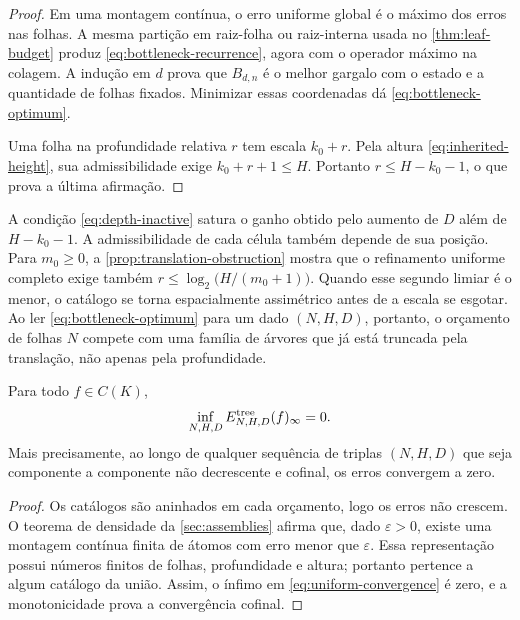 \begin{proof}
Em uma montagem contínua, o erro uniforme global é o máximo dos erros nas
folhas. A mesma partição em raiz-folha ou raiz-interna usada no
\cref{thm:leaf-budget} produz
\eqref{eq:bottleneck-recurrence}, agora com o operador máximo na colagem.
A indução em $d$ prova que $B_{d,n}$ é o melhor gargalo com o estado e a
quantidade de folhas fixados. Minimizar essas coordenadas dá
\eqref{eq:bottleneck-optimum}.

Uma folha na profundidade relativa $r$ tem escala $k_0+r$. Pela altura
\eqref{eq:inherited-height}, sua admissibilidade exige
$k_0+r+1\le H$. Portanto $r\le H-k_0-1$, o que prova a última afirmação.
\end{proof}

\begin{remark}
\label{rem:depth-vs-translation}
A condição \eqref{eq:depth-inactive} satura o ganho obtido pelo aumento de $D$
além de $H-k_0-1$. A admissibilidade de cada célula também depende de sua
posição.
Para $m_0\ge0$, a \cref{prop:translation-obstruction} mostra que o refinamento
uniforme completo exige também
$r\le\log_2\bigl(H/(m_0+1)\bigr)$. Quando esse segundo limiar é o menor, o
catálogo se torna espacialmente assimétrico antes de a escala se esgotar. Ao ler
\eqref{eq:bottleneck-optimum} para um dado $(N,H,D)$, portanto, o orçamento de
folhas $N$ compete com uma família de árvores que já está truncada pela
translação, não apenas pela profundidade.
\end{remark}

\begin{corollary}
\label{cor:uniform-convergence}
Para todo $f\in C(K)$,
\begin{equation}
 \inf_{N,H,D}E_{N,H,D}^{\rm tree}(f)_\infty=0.
 \label{eq:uniform-convergence}
\end{equation}
Mais precisamente, ao longo de qualquer sequência de triplas $(N,H,D)$ que
seja componente a componente não decrescente e cofinal, os erros convergem a
zero.
\end{corollary}

\begin{proof}
Os catálogos são aninhados em cada orçamento, logo os erros não crescem. O
teorema de densidade da \cref{sec:assemblies} afirma que, dado $\varepsilon>0$,
existe uma montagem contínua finita de átomos com erro menor que
$\varepsilon$. Essa representação possui números finitos de folhas,
profundidade e altura; portanto pertence a algum catálogo da união. Assim, o
ínfimo em \eqref{eq:uniform-convergence} é zero, e a monotonicidade prova a
convergência cofinal.
\end{proof}
